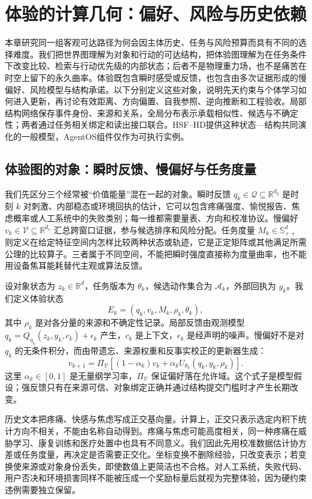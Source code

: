 \chapter{体验的计算几何：偏好、风险与历史依赖}
\label{chp:experience_geometry}
本章研究同一组客观可达路径为何会因主体历史、任务与风险预算而具有不同的选择难度。我们把世界图理解为对象和行动的可达结构，把体验图理解为在任务条件下改变比较、检索与行动优先级的内部状态；后者不是物理重力场，也不是痛苦在时空上留下的永久曲率。体验既包含瞬时感受或反馈，也包含由多次证据形成的慢偏好、风险模型与结构承诺。以下分别定义这些对象，说明先天约束与个体学习如何进入更新，再讨论有效距离、方向偏置、自我参照、逆向推断和工程验收。局部结构网络保存事件身份、来源和关系，全局分布表示承载相似性、候选与不确定性；两者通过任务相关绑定和读出接口联合。HSF--HD提供这种状态—结构共同演化的一般模型，AgentOS组件仅作为可执行实例。

\section{体验图的对象：瞬时反馈、慢偏好与任务度量}
\label{sec:section_9469}
我们先区分三个经常被“价值能量”混在一起的对象。瞬时反馈 $q_k\in\mathcal Q\subseteq\mathbb R^{d_q}$ 是时刻 $k$ 对刺激、内部稳态或环境回执的估计，它可以包含疼痛强度、愉悦报告、焦虑概率或人工系统中的失败类别；每一维都需要量表、方向和校准协议。慢偏好 $v_k\in\mathcal V\subseteq\mathbb R^{d_v}$ 汇总跨窗口证据，参与候选排序和风险分配。任务度量 $M_k\in\mathbb S_{++}^{d}$ 则定义在给定特征空间内怎样比较两种状态或轨迹，它是正定矩阵或其他满足所需公理的比较算子。三者属于不同空间，不能把瞬时强度直接称为度量曲率，也不能用设备焦耳能耗替代主观或算法反馈。

设对象状态为 $z_k\in\mathbb R^d$，任务版本为 $\theta_k$，候选动作集合为 $\mathcal A_k$，外部回执为 $y_k$。我们定义体验状态
\[
E_k=(q_k,v_k,M_k,\rho_k,\theta_k),
\]
其中 $\rho_k$ 是对各分量的来源和不确定性记录。局部反馈由观测模型 $q_k=Q_{\eta_k}(z_k,y_k,c_k)+\epsilon_k$ 产生，$c_k$ 是上下文，$\epsilon_k$ 是经声明的噪声。慢偏好不是对 $q_k$ 的无条件积分，而由带遗忘、来源权重和反事实校正的更新器生成：
\[
v_{k+1}=\Pi_{\mathcal V}\!\left[(1-\alpha_k)v_k+\alpha_k U_{\theta_k}(q_k,y_k,\rho_k)\right].
\]
这里 $\alpha_k\in[0,1]$ 是无量纲学习率，$\Pi_{\mathcal V}$ 保证偏好落在允许域。这个式子是模型假设；强反馈只有在来源可信、对象绑定正确并通过结构提交门槛时才产生长期改变。

历史文本把疼痛、快感与焦虑写成正交基向量。计算上，正交只表示选定内积下统计方向不相关，不能由名称自动得到。疼痛与焦虑可能高度相关，同一种疼痛在威胁学习、康复训练和医疗处置中也具有不同意义。我们因此先用校准数据估计协方差或任务度量，再决定是否需要正交化。坐标变换不删除经验，只改变表示；若变换使来源或对象身份丢失，即使数值上更简洁也不合格。对人工系统，失败代码、用户否决和环境损害同样不能被压成一个奖励标量后就视为完整体验，因为硬约束违例需要独立保留。

